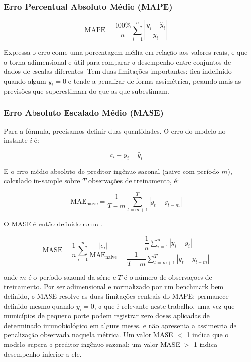 \documentclass[
    12pt,
    openright,
    oneside,
    a4paper,
    english,
    brazil
]{abntex2}
\begin{document}
\subsubsection{Erro Percentual Absoluto Médio (MAPE)}
\label{subsec:mape}

\begin{equation}
\text{MAPE} = \frac{100\%}{n}\sum_{i=1}^{n}\left|\frac{y_i - \hat{y}_i}{y_i}\right|
\end{equation}

Expressa o erro como uma porcentagem média em relação aos valores reais, o que o torna adimensional e útil para comparar o desempenho entre conjuntos de dados de escalas diferentes. Tem duas limitações importantes: fica indefinido quando algum $y_i = 0$ e tende a penalizar de forma assimétrica, pesando mais as previsões que superestimam do que as que subestimam.

\subsubsection{Erro Absoluto Escalado Médio (MASE)}
\label{subsec:mase}

Para a fórmula, precisamos definir duas quantidades. O erro do modelo no instante $i$ é:

\begin{equation}
e_i = y_i - \hat{y}_i
\end{equation}

E o erro médio absoluto do preditor ingênuo sazonal (naive com período $m$), calculado in-sample sobre $T$ observações de treinamento, é:

\begin{equation}
\text{MAE}_{\text{naive}} = \frac{1}{T-m}\sum_{t=m+1}^{T}\left|y_t - y_{t-m}\right|
\end{equation}

O MASE é então definido como \cite{Hyndman2006}:

\begin{equation}
\text{MASE} = \frac{1}{n}\sum_{i=1}^{n}\frac{\left|e_i\right|}{\text{MAE}_{\text{naive}}} = \dfrac{\dfrac{1}{n}\displaystyle\sum_{i=1}^{n}\left|y_i - \hat{y}_i\right|}{\dfrac{1}{T-m}\displaystyle\sum_{t=m+1}^{T}\left|y_t - y_{t-m}\right|}
\end{equation}

onde $m$ é o período sazonal da série e $T$ é o número de observações de treinamento. Por ser adimensional e normalizado por um benchmark bem definido, o MASE resolve as duas limitações centrais do MAPE: permanece definido mesmo quando $y_i = 0$, o que é relevante neste trabalho, uma vez que municípios de pequeno porte podem registrar zero doses aplicadas de determinado imunobiológico em alguns meses, e não apresenta a assimetria de penalização observada naquela métrica. Um valor MASE $<$ 1 indica que o modelo supera o preditor ingênuo sazonal; um valor MASE $>$ 1 indica desempenho inferior a ele.
\end{document}
